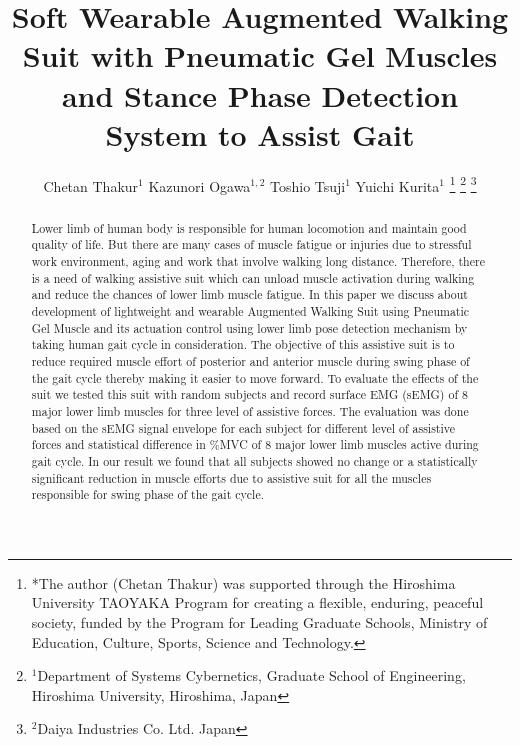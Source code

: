 \documentclass[letterpaper, 10 pt, conference]{ieeeconf}  %
\title{\LARGE \bf
Soft Wearable Augmented Walking Suit with Pneumatic Gel Muscles and Stance Phase Detection System to Assist Gait
}
\author{Chetan Thakur$^{1}$ Kazunori Ogawa$^{1,2}$ Toshio Tsuji$^{1}$ Yuichi Kurita$^{1}$%
\thanks{*The author (Chetan Thakur) was supported through the Hiroshima University
TAOYAKA Program for creating a flexible, enduring, peaceful society, funded by the Program for Leading
Graduate Schools, Ministry of Education, Culture, Sports, Science and Technology.}%
\thanks{$^{1}$Department of Systems Cybernetics, Graduate School of Engineering,
	Hiroshima University, Hiroshima, Japan
        {\tt\small }}%
\thanks{$^{2}$Daiya Industries Co. Ltd. Japan
        {\tt\small }}%
}
\begin{document}
\setlength{\pdfpageheight}{11in}
\setlength{\pdfpagewidth}{8.5in}

\maketitle
\thispagestyle{empty}
\pagestyle{empty}

\maketitle
\thispagestyle{empty}
\pagestyle{empty}


\begin{abstract}

Lower limb of human body is responsible for human locomotion and maintain good quality of life. But there are many cases of muscle fatigue or injuries due to stressful work environment, aging and work that involve walking long distance. Therefore, there is a need of walking assistive suit which can unload muscle activation during walking and reduce the chances of lower limb muscle fatigue. In this paper we discuss about development of lightweight and wearable Augmented Walking Suit using Pneumatic Gel Muscle and its actuation control using lower limb pose detection mechanism by taking human gait cycle in consideration. The objective of this assistive suit is to reduce required muscle effort of posterior and anterior muscle during swing phase of the gait cycle thereby making it easier to move forward. To evaluate the effects of the suit we tested this suit with random subjects and record surface EMG (sEMG) of 8 major lower limb muscles for three level of assistive forces. The evaluation was done based on the sEMG signal envelope for each subject for different level of assistive forces and statistical difference in \%MVC of 8 major lower limb muscles active during gait cycle. In our result we found that all subjects showed no change or a statistically significant reduction in muscle efforts due to assistive suit for all the muscles responsible for swing phase of the gait cycle. 
\end{abstract}


\end{document}
